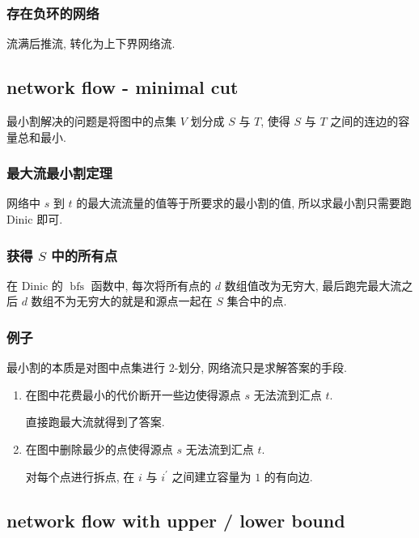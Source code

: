 \documentclass[UTF8, a4paper, titlepage, twoside]{ctexart}
\begin{document}
\subsubsection*{ 存在负环的网络 }
流满后推流, 转化为上下界网络流.

\subsection{ network flow - minimal cut }
最小割解决的问题是将图中的点集 \(V\) 划分成 \(S\) 与 \(T\), 使得 \(S\) 与 \(T\) 之间的连边的容量总和最小.

\subsubsection*{ 最大流最小割定理 }
网络中 \(s\) 到 \(t\) 的最大流流量的值等于所要求的最小割的值, 所以求最小割只需要跑 Dinic 即可.

\subsubsection*{ 获得 \(S\) 中的所有点 }
在 Dinic 的 \(\operatorname{bfs}\) 函数中, 每次将所有点的 \(d\) 数组值改为无穷大, 最后跑完最大流之后 \(d\) 数组不为无穷大的就是和源点一起在 \(S\) 集合中的点.

\subsubsection*{ 例子 }
最小割的本质是对图中点集进行 \(2\)-划分, 网络流只是求解答案的手段.
\begin{enumerate}
    \item 在图中花费最小的代价断开一些边使得源点 \(s\) 无法流到汇点 \(t\).

          直接跑最大流就得到了答案.
    \item 在图中删除最少的点使得源点 \(s\) 无法流到汇点 \(t\).

          对每个点进行拆点, 在 \(i\) 与 \(i^\prime\) 之间建立容量为 \(1\) 的有向边.
\end{enumerate}

\subsection{ network flow with upper / lower bound }
\end{document}
